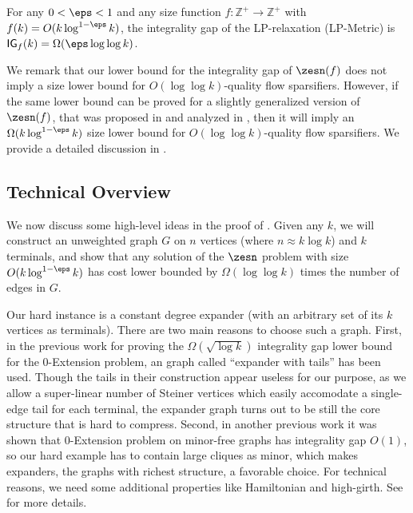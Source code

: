 \begin{theorem}
\label{thm: 0-ext with Steiner lower}
For any $0<\eps<1$ and any size function $f:\mathbb{Z}^+\to \mathbb{Z}^+$ with $f(k)=O(k\log^{1-\eps} k)$, 
the integrality gap of the LP-relaxation (\textnormal{\textsf{LP-Metric}}) is $\textnormal{\textsf{IG}}_f(k)=\Omega(\eps \log\log k)$.
\end{theorem}


We remark that our lower bound for the integrality gap of $\zesn(f)$ does not imply a size lower bound for $O(\log\log k)$-quality flow sparsifiers. However, if the same lower bound can be proved for a slightly generalized version of $\zesn(f)$, that was proposed in \cite{andoni2014towards} and analyzed in \cite{chen20241+}, then it will imply an $\Omega(k\log^{1-\eps} k)$ size lower bound for $O(\log\log k)$-quality flow sparsifiers. We provide a detailed discussion in .

\subsection{Technical Overview}

We now discuss some high-level ideas in the proof of  . Given any $k$, we will construct an unweighted graph $G$ on $n$ vertices (where $n\approx k\log k$) and $k$ terminals, and show that any solution of the $\zesn$ problem with size $O(k\log^{1-\eps} k)$ has cost lower bounded by $\Omega(\log\log k)$ times the number of edges in $G$.

Our hard instance is a constant degree expander (with an arbitrary set of its $k$ vertices as terminals). There are two main reasons to choose such a graph. First, in the previous work \cite{calinescu2005approximation} for proving the $\Omega(\sqrt{\log k})$ integrality gap lower bound for the $0$-Extension problem, an graph called ``expander with tails'' has been used. Though the tails in their construction appear useless for our purpose, as we allow a super-linear number of Steiner vertices which easily accomodate a single-edge tail for each terminal, the expander graph turns out to be still the core structure that is hard to compress.
Second, in another previous work \cite{archer2004approximate} it was shown that $0$-Extension problem on minor-free graphs has integrality gap $O(1)$, so our hard example has to contain large cliques as minor, which makes expanders, the graphs with richest structure,  a favorable choice. For technical reasons, we need some additional properties like Hamiltonian and high-girth. See  for more details.

